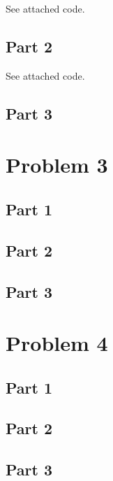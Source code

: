 \documentclass[12pt]{article}
\begin{document}
See attached code.

\subsection{Part 2}

See attached code.

\subsection{Part 3}


\section{Problem 3}

\subsection{Part 1}


\subsection{Part 2}


\subsection{Part 3}


\section{Problem 4}

\subsection{Part 1}


\subsection{Part 2}


\subsection{Part 3}
\end{document}
